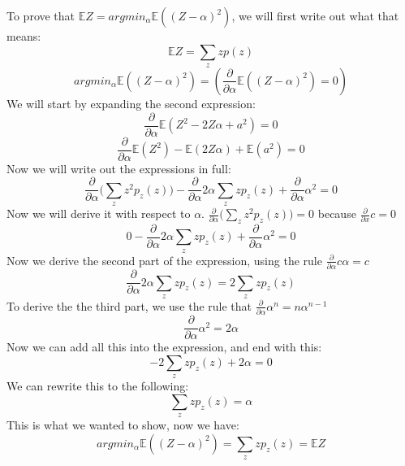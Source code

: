 To prove that $\mathbb{E}Z = argmin_\alpha\mathbb{E}((Z-\alpha)^2)$, we will first write out what that means:
$$
\mathbb{E}Z=\sum_zzp(z)
$$
$$
argmin_\alpha\mathbb{E}((Z-\alpha)^2) = \left(\frac{\partial}{\partial\alpha} \mathbb{E}((Z-\alpha)^2)=0\right)
$$
We will start by expanding the second expression:
$$
\frac{\partial}{\partial\alpha}\mathbb{E}(Z^2-2Z\alpha+a^2) = 0
$$
$$
\frac{\partial}{\partial\alpha}\mathbb{E}(Z^2)-\mathbb{E}(2Z\alpha)+\mathbb{E}(a^2) = 0
$$
Now we will write out the expressions in full:
$$
\frac{\partial}{\partial\alpha}\Big(\sum_zz^2p_z(z)\Big)-\frac{\partial}{\partial\alpha}2\alpha\sum_zzp_z(z)+\frac{\partial}{\partial\alpha}\alpha^2 = 0
$$
Now we will derive it with respect to $\alpha$. $\frac{\partial}{\partial\alpha}\Big(\sum_zz^2p_z(z)\Big) = 0$ because $\frac{\partial}{\partial x}c = 0$ 
$$
0-\frac{\partial}{\partial\alpha}2\alpha\sum_zzp_z(z)+\frac{\partial}{\partial\alpha}\alpha^2 = 0
$$
Now we derive the second part of the expression, using the rule $\frac{\partial}{\partial\alpha}c\alpha = c$
$$
\frac{\partial}{\partial\alpha}2\alpha\sum_zzp_z(z) = 2\sum_zzp_z(z)
$$
To derive the the third part, we use the rule that $\frac{\partial}{\partial\alpha}\alpha^n = n\alpha^{n-1}$
$$
\frac{\partial}{\partial\alpha}\alpha^2 = 2\alpha
$$
Now we can add all this into the expression, and end with this:
$$
-2\sum_zzp_z(z)+2\alpha = 0
$$
We can rewrite this to the following:
$$
\sum_zzp_z(z)= \alpha
$$
This is what we wanted to show, now we have:
$$
argmin_\alpha\mathbb{E}((Z-\alpha)^2) = \sum_zzp_z(z) = \mathbb{E}Z
$$